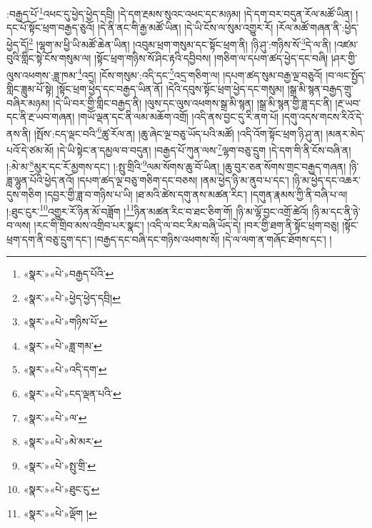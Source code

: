 :བརྒྱད་པོ་\footnote{«སྣར་»«པེ་»བརྒྱད་པོའི་}འཕང་དུ་ཕྱེད་ཕྱེད་དབྲི། །དེ་དག་རྔམས་སུའང་འཕང་དང་མཉམ། །དེ་དག་བར་བདུན་རོལ་མཚོ་ཡིན། །དང་པོ་སྟོང་ཕྲག་བརྒྱད་ཅུའོ། །དེ་ནི་ནང་གི་རྒྱ་མཚོ་ཡིན། །དེ་ཡི་ངོས་ལ་སུམ་འགྱུར་རོ། །རོལ་མཚོ་གཞན་ནི་:ཕྱེད་ཕྱེད་དོ།\footnote{«སྣར་»«པེ་»ཕྱེད་ཕྱེད་དབྲི།} །ལྷག་མ་ཕྱི་ཡི་མཚོ་ཆེན་ཡིན། །འབུམ་ཕྲག་གསུམ་དང་སྟོང་ཕྲག་ནི། །ཉི་ཤུ་:གཉིས་སོ་\footnote{«སྣར་»«པེ་»གཉིས་པོ་}དེ་ལ་ནི། །འཛམ་བུའི་གླིང་སྟེ་ངོས་གསུམ་ལ། །སྟོང་ཕྲག་གཉིས་སོ་ཤིང་རྟའི་དབྱིབས། །གཅིག་ལ་དཔག་ཚད་ཕྱེད་དང་བཞི། །ཤར་གྱི་ལུས་འཕགས་:ཟླ་ཁམ་\footnote{«སྣར་»«པེ་»ཟླ་གམ་}འདྲ། །ངོས་གསུམ་:འདི་དང་\footnote{«སྣར་»«པེ་»འདི་དག་}འདྲ་གཅིག་ལ། །དཔག་ཚད་སུམ་བརྒྱ་ལྔ་བཅུའོ། །བ་ལང་སྤྱོད་གླིང་ཟླུམ་པོ་སྟེ། །སྟོང་ཕྲག་ཕྱེད་དང་བརྒྱད་ཡིན་ནོ། །དེའི་དབུས་སྟོང་ཕྲག་ཕྱེད་དང་གསུམ། །སྒྲ་མི་སྙན་བརྒྱད་གྲུ་བཞིར་མཉམ། །དེ་ཡི་བར་གྱི་གླིང་བརྒྱད་ནི། །ལུས་དང་ལུས་འཕགས་སྒྲ་མི་སྙན། །སྒྲ་མི་སྙན་གྱི་ཟླ་དང་ནི། །རྔ་ཡབ་དང་ནི་རྔ་ཡབ་གཞན། །གཡོ་ལྡན་དང་ནི་ལམ་མཆོག་འགྲོ། །འདི་ནས་བྱང་དུ་རི་ནག་པོ། །དགུ་འདས་གངས་རིའོ་དེ་ནས་ནི། །སྤོས་:ངད་ལྡང་བའི་\footnote{«སྣར་»«པེ་»ངད་ལྡན་པའི་}ཚུ་རོལ་ན། །ཆུ་ཞེང་ལྔ་བཅུ་ཡོད་པའི་མཚོ། །འདི་འོག་སྟོང་ཕྲག་ཉི་ཤུ་ན། །མནར་མེད་པའོ་དེ་ཙམ་མོ། །དེ་ཡི་སྟེང་ན་དམྱལ་བ་བདུན། །བརྒྱད་པོ་ཀུན་ལས་\footnote{«སྣར་»«པེ་»ལ་}ལྷག་བཅུ་དྲུག །དེ་དག་གི་ནི་ངོས་བཞི་ན། །:མེ་མ་\footnote{«སྣར་»«པེ་»མེ་མར་}མུར་དང་རོ་མྱགས་དང་། །:སྤུ་གྲིའི་\footnote{«སྣར་»«པེ་»སྤུ་གྲི་}ལམ་སོགས་ཆུ་བོ་ཡིན། །ཆུ་བུར་ཅན་སོགས་གྲང་བརྒྱད་གཞན། །ཉི་ཟླ་ལྷུན་པོའི་ཕྱེད་ནའོ། །དཔག་ཚད་ལྔ་བཅུ་གཅིག་དང་བཅས། །ནམ་ཕྱེད་ཉི་མ་ནུབ་པ་དང་། །ཉི་མ་ཕྱེད་དང་འཆར་དུས་གཅིག །དབྱར་གྱི་ཟླ་བ་གཉིས་པ་ཡི། །ཐ་མའི་ཚེས་དགུ་ནས་མཚན་རིང་། །དགུན་རྣམས་ཀྱི་ནི་བཞི་པ་ལ། །:ཐུང་ངུར་\footnote{«སྣར་»«པེ་»ཐུང་ངུ་}འགྱུར་རོ་ཉིན་མོ་བཟློག །\footnote{«སྣར་»«པེ་»ལྡོག །}ཉིན་མཚན་རིང་བ་ཐང་ཅིག་གོ། །ཉི་མ་ལྷོ་བྱང་འགྲོ་ཚེའོ། །ཉི་མ་དང་ནི་ཉེ་བ་ལས། །རང་གི་གྲིབ་མས་འགྲིབ་པར་སྣང་། །འདི་ལ་བང་རིམ་བཞི་ཡོད་དེ། །བར་གྱི་ཐག་ནི་སྟོང་ཕྲག་བཅུ། །སྟོང་ཕྲག་དག་ནི་བཅུ་དྲུག་དང་། །བརྒྱད་དང་བཞི་དང་གཉིས་འཕགས་སོ། །དེ་ལ་ལག་ན་གཞོང་ཐོགས་དང་། །
